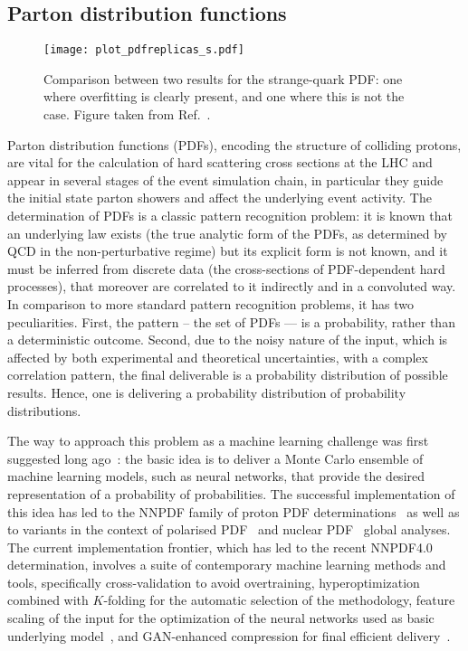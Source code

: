 \documentclass[submission,Phys]{SciPost}
\begin{document}
\subsection{Parton distribution functions}
\label{sec:generators_pdf}

\begin{figure}[t]
\centering
  \texttt{[image: plot\_pdfreplicas\_s.pdf]}
  \caption{Comparison between two results for the strange-quark PDF: one where overfitting is clearly present, and one where this is not the case. Figure taken from Ref.~\cite{NNPDF:2021njg}.}
  \label{fig:charm_pdf}
\end{figure}

Parton distribution functions (PDFs), encoding the structure of colliding protons,
are vital for the calculation of hard scattering cross sections at the LHC and appear in several
stages of the event simulation chain, in particular they guide the initial state parton showers and affect the underlying event activity. The determination of PDFs is a classic pattern recognition problem: it is known that an underlying law exists (the true analytic form of the PDFs, as determined by QCD in the non-perturbative regime) but its explicit form  is not known, and it must be inferred from discrete data (the cross-sections of PDF-dependent hard processes), that moreover are correlated to it indirectly and in a convoluted way. In comparison to more standard pattern recognition problems, it has two peculiarities. First,  the pattern -- the set of PDFs --- is a probability, rather than a deterministic outcome. Second, due to the noisy nature of the input, which is affected by both experimental and theoretical uncertainties, with a complex correlation pattern, the final deliverable is a probability distribution of possible results. Hence, one is delivering a probability distribution of probability distributions. 

The way to approach this problem as a machine learning challenge was first suggested long ago~\cite{Forte:2002fg}: the basic idea is to deliver a Monte Carlo ensemble of machine learning models, such as neural networks, that provide the desired representation of a probability of probabilities. The successful implementation of this idea has led to the NNPDF family of proton PDF determinations~\cite{Ball:2010de,NNPDF:2014otw,NNPDF:2021uiq,NNPDF:2021njg} as well as to variants in the context of polarised PDF~\cite{Nocera:2014gqa} and nuclear PDF~\cite{AbdulKhalek:2022fyi,AbdulKhalek:2020yuc} global analyses.
%
The current implementation frontier, which has led
to the recent NNPDF4.0 determination, involves a suite of contemporary machine learning methods and tools, specifically cross-validation to avoid overtraining, hyperoptimization~\cite{Carrazza:2019mzf} combined with $K$-folding for the automatic selection of the methodology, feature scaling of the input for the optimization of the neural networks used as basic underlying model~\cite{Carrazza:2021yrg}, and GAN-enhanced compression for final efficient delivery~\cite{Carrazza:2015hva,Carrazza:2021hny}.
\end{document}
